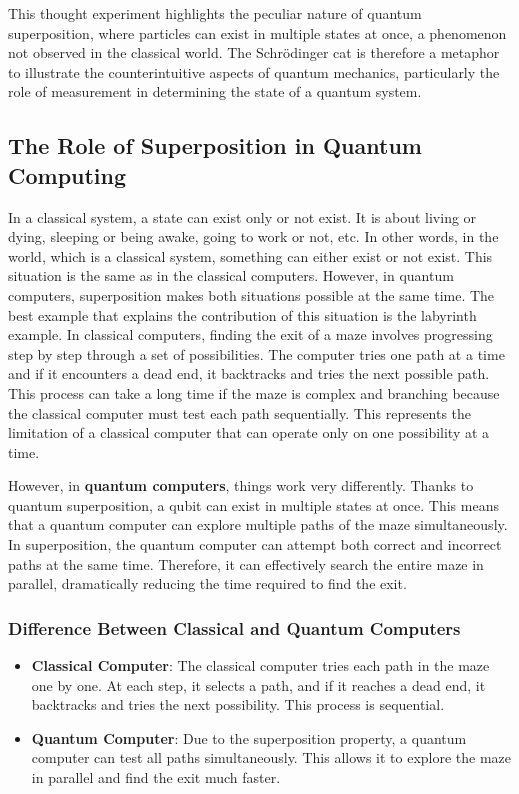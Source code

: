 \documentclass{article}
\begin{document}
This thought experiment highlights the peculiar nature of quantum superposition, where particles can exist in multiple states at once, a phenomenon not observed in the classical world. The Schrödinger cat is therefore a metaphor to illustrate the counterintuitive aspects of quantum mechanics, particularly the role of measurement in determining the state of a quantum system.
\subsection{The Role of Superposition in Quantum Computing}
In a classical system, a state can exist only or not exist. It is about living or dying, sleeping or being awake, going to work or not, etc. In other words, in the world, which is a classical system, something can either exist or not exist. This situation is the same as in the classical computers. However, in quantum computers, superposition makes both situations possible at the same time. The best example that explains the contribution of this situation is the labyrinth example.
In classical computers, finding the exit of a maze involves progressing step by step through a set of possibilities. The computer tries one path at a time and if it encounters a dead end, it backtracks and tries the next possible path. This process can take a long time if the maze is complex and branching because the classical computer must test each path sequentially. This represents the limitation of a classical computer that can operate only on one possibility at a time.

However, in \textbf{quantum computers}, things work very differently. Thanks to quantum superposition, a qubit can exist in multiple states at once. This means that a quantum computer can explore multiple paths of the maze simultaneously. In superposition, the quantum computer can attempt both correct and incorrect paths at the same time. Therefore, it can effectively search the entire maze in parallel, dramatically reducing the time required to find the exit.

\subsubsection*{Difference Between Classical and Quantum Computers}

\begin{itemize}
    \item \textbf{Classical Computer}: The classical computer tries each path in the maze one by one. At each step, it selects a path, and if it reaches a dead end, it backtracks and tries the next possibility. This process is sequential.
    
    \item \textbf{Quantum Computer}: Due to the superposition property, a quantum computer can test all paths simultaneously. This allows it to explore the maze in parallel and find the exit much faster.
\end{itemize}
\end{document}
